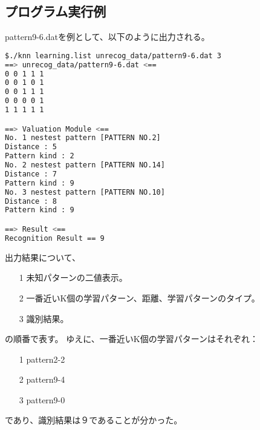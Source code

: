\documentclass[ %
  uplatex,%
  papersize%
]{jsarticle}
\begin{document}
\subsection{プログラム実行例}


pattern9-6.datを例として、以下のように出力される。

\begin{lstlisting}[language=bash]
$./knn learning.list unrecog_data/pattern9-6.dat 3
==> unrecog_data/pattern9-6.dat <==
0 0 1 1 1
0 0 1 0 1
0 0 1 1 1
0 0 0 0 1
1 1 1 1 1

==> Valuation Module <==
No. 1 nestest pattern [PATTERN NO.2]
Distance : 5
Pattern kind : 2
No. 2 nestest pattern [PATTERN NO.14]
Distance : 7
Pattern kind : 9
No. 3 nestest pattern [PATTERN NO.10]
Distance : 8
Pattern kind : 9

==> Result <==
Recognition Result == 9
\end{lstlisting}

出力結果について、

\begin{itemize}
\small
\item[1] 未知パターンの二値表示。
\item[2] 一番近いK個の学習パターン、距離、学習パターンのタイプ。
\item[3] 識別結果。
\end{itemize}
の順番で表す。
ゆえに、一番近いK個の学習パターンはそれぞれ：

\begin{itemize}
\small
\item[1] pattern2-2
\item[2] pattern9-4
\item[3] pattern9-0
\end{itemize}

であり、識別結果は９であることが分かった。
\end{document}
